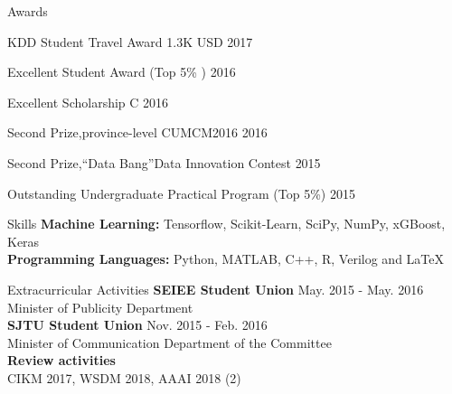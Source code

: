 \documentclass{resume} %
\begin{document}

\begin{rSection}{Awards}
\begin{rSubsection}{}{}{}{}
\item KDD Student Travel Award \hfill{1.3K USD 2017}
\item Excellent Student Award (Top 5\% )  \hfill{2016}
\item Excellent Scholarship C \hfill{2016}
\item Second Prize,province-level CUMCM2016 \hfill{2016}
\item Second Prize,``Data Bang''Data Innovation Contest \hfill{2015} 
\item Outstanding Undergraduate Practical Program (Top 5\%) \hfill{2015}
\end{rSubsection}
\end{rSection}

\begin{rSection}{Skills}
{\bf Machine Learning: }
\hspace*{3.0 cm} Tensorflow, Scikit-Learn, SciPy, NumPy, xGBoost, Keras\\
{\bf Programming Languages: }
\hspace*{1.8 cm} Python, MATLAB, C++, R, Verilog and \LaTeX  \\
\end{rSection}
\begin{rSection}{Extracurricular Activities}
\textbf{SEIEE Student Union} \hfill{May. 2015 - May. 2016}\\
Minister of Publicity Department  \\
\textbf{SJTU Student Union} \hfill{Nov. 2015 - Feb. 2016}\\
Minister of Communication Department of the Committee \\
\textbf{Review activities} \\
CIKM 2017, WSDM 2018, AAAI 2018 (2)
\end{rSection}
\clearpage
\end{document}
